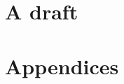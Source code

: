 \documentclass[letter,10pt,openany]{book}
\begin{document}

\maketitle
\thispagestyle{empty}
\tableofcontents


\chapter{A draft}
    \label{c-draft}







\appendix
\chapter{Appendices}






\end{document}
